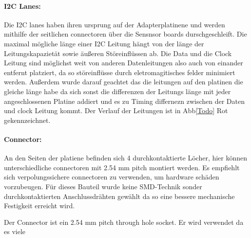\paragraph{I2C Lanes:}
Die I2C lanes haben ihren ursprung auf der Adapterplatinene und werden mithilfe der seitlichen connectoren über die Sensnsor boards durschgeschleift.
Die maximal mögliche länge einer I2C Leitung hängt von der länge der Leitungskapazietät sowie äußeren Störeinflüssen ab.
Die Data und die Clock Leitung sind möglichst weit von anderen Datenleitungen  also auch von einander entfernt platziert, da so störeinflüsse durch eletromagitisches felder minimiert werden.
Außerdem wurde darauf geachtet das die leitungen auf den platinen die gleiche länge habe da sich sonst die differenzen der Leitungs länge mit jeder angeschlossenen Platine addiert und es zu Timing differnezn zwischen der Daten und clock Leitung kommt.
Der Verlauf der Leitungen ist in Abb\ref{Todo} Rot gekennzeichnet.

\paragraph{Connector:} An den Seiten der platiene befinden sich 4 durchkontaktierte Löcher, hier können unterschiedliche connectoren mit 2.54 mm pitch montiert werden.
	Es empfiehlt sich verpolungssichere connectoren zu verwenden, um hardware schäden vorzubeugen.
	Für dieses Bauteil wurde  keine SMD-Technik sonder durchkontaktierten Anschlussdrähten gewählt da so eine bessere mechanische Festigkeit erreicht wird.

Der Connector ist ein 2.54 mm pitch through hole socket.
	Er wird verwendet da es viele 

